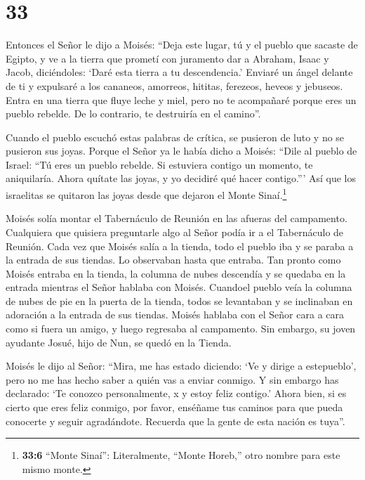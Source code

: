 \hypertarget{section-32}{%
\section{33}\label{section-32}}

 Entonces el Señor le dijo a Moisés: ``Deja este lugar, tú y
el pueblo que sacaste de Egipto, y ve a la tierra que prometí con
juramento dar a Abraham, Isaac y Jacob, diciéndoles: `Daré esta tierra a
tu descendencia.'  Enviaré un ángel delante de ti y
expulsaré a los cananeos, amorreos, hititas, ferezeos, heveos y
jebuseos.  Entra en una tierra que fluye leche y miel, pero
no te acompañaré porque eres un pueblo rebelde. De lo contrario, te
destruiría en el camino''.

 Cuando el pueblo escuchó estas palabras de crítica, se
pusieron de luto y no se pusieron sus joyas.  Porque el
Señor ya le había dicho a Moisés: ``Dile al pueblo de Israel: ``Tú eres
un pueblo rebelde. Si estuviera contigo un momento, te aniquilaría.
Ahora quítate las joyas, y yo decidiré qué hacer contigo.'''
 Así que los israelitas se quitaron las joyas desde que
dejaron el Monte Sinaí.\footnote{\textbf{33:6} ``Monte Sinaí'':
  Literalmente, ``Monte Horeb,'' otro nombre para este mismo monte.}

 Moisés solía montar el Tabernáculo de Reunión en las
afueras del campamento. Cualquiera que quisiera preguntarle algo al
Señor podía ir a el Tabernáculo de Reunión.  Cada vez que
Moisés salía a la tienda, todo el pueblo iba y se paraba a la entrada de
sus tiendas. Lo observaban hasta que entraba.  Tan pronto
como Moisés entraba en la tienda, la columna de nubes descendía y se
quedaba en la entrada mientras el Señor hablaba con Moisés.
 Cuandoel pueblo veía la columna de nubes de pie en la
puerta de la tienda, todos se levantaban y se inclinaban en adoración a
la entrada de sus tiendas.  Moisés hablaba con el Señor
cara a cara como si fuera un amigo, y luego regresaba al campamento. Sin
embargo, su joven ayudante Josué, hijo de Nun, se quedó en la Tienda.

 Moisés le dijo al Señor: ``Mira, me has estado diciendo:
`Ve y dirige a estepueblo', pero no me has hecho saber a quién vas a
enviar conmigo. Y sin embargo has declarado: `Te conozco personalmente,
x y estoy feliz contigo.'  Ahora bien, si es cierto que
eres feliz conmigo, por favor, enséñame tus caminos para que pueda
conocerte y seguir agradándote. Recuerda que la gente de esta nación es
tuya''.

